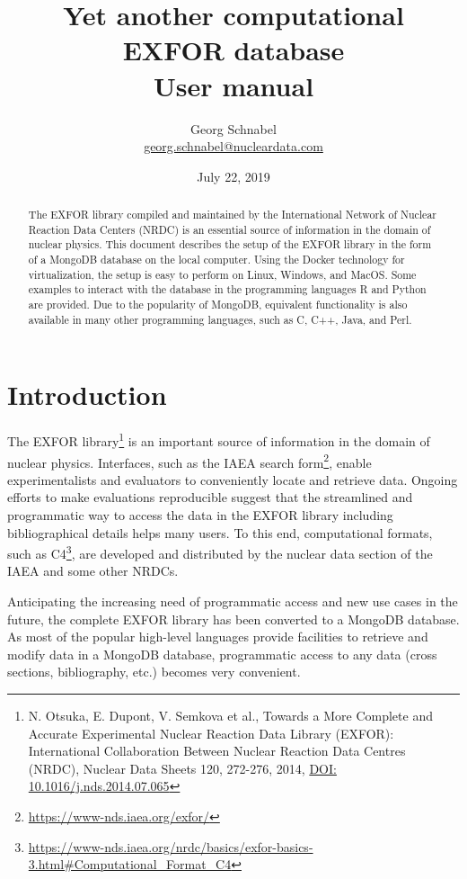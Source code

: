 \documentclass[12pt,a4paper]{scrartcl}
\title{\textbf{Yet another computational\\ EXFOR database} \\[2ex] User manual}
\date{July 22, 2019}
\author{Georg Schnabel \\ \href{mailto:georg.schnabel@nucleardata.com}{georg.schnabel@nucleardata.com}}
\begin{document}
 \maketitle
 \begin{abstract}
 The EXFOR library compiled and maintained by the International Network of Nuclear Reaction Data Centers (NRDC) is an essential source of information in the domain of nuclear physics.
 This document describes the setup of the EXFOR library in the form of a MongoDB database on the local computer.
 Using the Docker technology for virtualization, the setup is easy to perform on Linux, Windows, and MacOS.
 Some examples to interact with the database in the programming languages R and Python are provided.
 Due to the popularity of MongoDB, equivalent functionality is also available in many other programming languages, such as C, C++, Java, and Perl.
 \end{abstract} 
 \newpage
 \tableofcontents
 \newpage 

 \section{Introduction}
 The EXFOR library\footnote{N. Otsuka, E. Dupont, V. Semkova et al., Towards a More Complete and Accurate Experimental Nuclear Reaction Data Library (EXFOR): International Collaboration Between Nuclear Reaction Data Centres (NRDC), Nuclear Data Sheets 120, 272-276, 2014, \href{http://dx.doi.org/10.1016/j.nds.2014.07.065}{DOI: 10.1016/j.nds.2014.07.065}} is an important source of information in the domain of nuclear physics.
 Interfaces, such as the IAEA search form\footnote{\url{https://www-nds.iaea.org/exfor/}}, enable experimentalists and evaluators to conveniently locate and retrieve data.
 Ongoing efforts to make evaluations reproducible suggest that the streamlined and programmatic way to access the data in the EXFOR library including bibliographical details helps many users.
 To this end, computational formats, such as C4\footnote{\url{https://www-nds.iaea.org/nrdc/basics/exfor-basics-3.html\#Computational_Format_C4}}, are developed and distributed by the nuclear data section of the IAEA and some other NRDCs.
 
 Anticipating the increasing need of programmatic access and new use cases in the future, the complete EXFOR library has been converted to a MongoDB database.
 As most of the popular high-level languages provide facilities to retrieve and modify data in a MongoDB database, programmatic access to any data (cross sections, bibliography, etc.) becomes very convenient.
\end{document}
